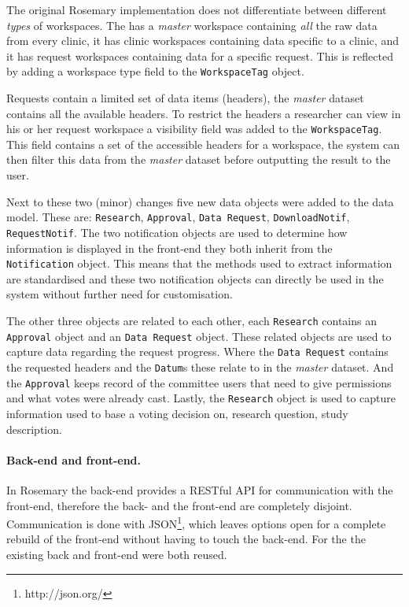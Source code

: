 The original Rosemary implementation does not differentiate between different \emph{types} of workspaces. 
The \ivfsystem{} has a \emph{master} workspace containing \emph{all} the raw data from every clinic, it has clinic workspaces containing data specific to a clinic, and it has request workspaces containing data for a specific request.
This is reflected by adding a workspace type field to the {\tt WorkspaceTag} object.

Requests contain a limited set of data items (headers), the \emph{master} dataset contains all the available headers.
To restrict the headers a researcher can view in his or her request workspace a visibility field was added to the {\tt WorkspaceTag}.
This field contains a set of the accessible headers for a workspace, the system can then filter this data from the \emph{master} dataset before outputting the result to the user.

Next to these two (minor) changes five new data objects were added to the data model.
These are: {\tt Research}, {\tt Approval}, {\tt Data Request}, {\tt DownloadNotif}, {\tt RequestNotif}.
The two notification objects are used to determine how information is displayed in the front-end they both inherit from the {\tt Notification} object.
This means that the methods used to extract information are standardised and these two notification objects can directly be used in the system without further need for customisation.

The other three objects are related to each other, each {\tt Research} contains an {\tt Approval} object and an {\tt Data Request} object.
These related objects are used to capture data regarding the request progress.
Where the {\tt Data Request} contains the requested headers and the {\tt Datum}s these relate to in the \emph{master} dataset.
And the {\tt Approval} keeps record of the committee users that need to give permissions and what votes were already cast.
Lastly, the {\tt Research} object is used to capture information used to base a voting decision on, \eg{} research question, study description.


\paragraph{Back-end and front-end.}
In Rosemary the back-end provides a RESTful API for communication with the front-end, therefore the back- and the front-end are completely disjoint.
Communication is done with JSON\footnote{http://json.org/}, which leaves options open for a complete rebuild of the front-end without having to touch the back-end.
For the \ivfsystem{} the existing back and front-end were both reused. 

